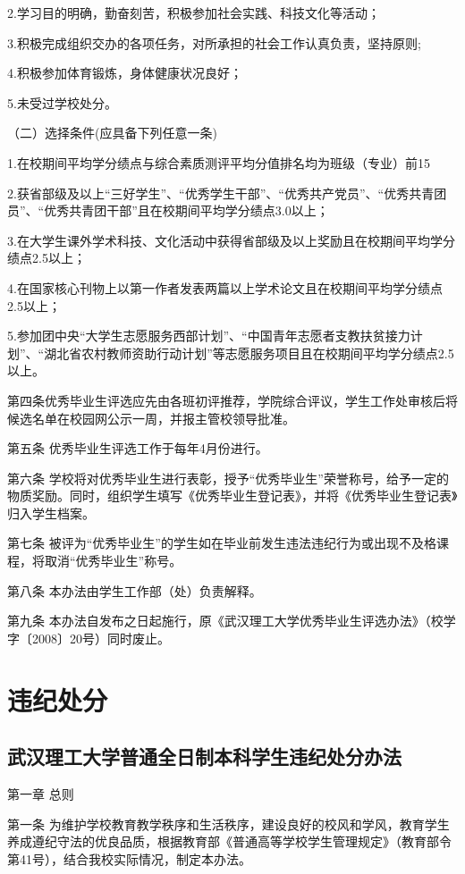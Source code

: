 \documentclass[UTF8,12pt,a4paper]{report}
\begin{document}
2.学习目的明确，勤奋刻苦，积极参加社会实践、科技文化等活动；

3.积极完成组织交办的各项任务，对所承担的社会工作认真负责，坚持原则;

4.积极参加体育锻炼，身体健康状况良好；

5.未受过学校处分。

（二）选择条件(应具备下列任意一条)

1.在校期间平均学分绩点与综合素质测评平均分值排名均为班级（专业）前15%

2.获省部级及以上“三好学生”、“优秀学生干部”、“优秀共产党员”、“优秀共青团员”、“优秀共青团干部”且在校期间平均学分绩点3.0以上；

3.在大学生课外学术科技、文化活动中获得省部级及以上奖励且在校期间平均学分绩点2.5以上；

4.在国家核心刊物上以第一作者发表两篇以上学术论文且在校期间平均学分绩点2.5以上；

5.参加团中央“大学生志愿服务西部计划”、“中国青年志愿者支教扶贫接力计划”、“湖北省农村教师资助行动计划”等志愿服务项目且在校期间平均学分绩点2.5以上。

第四条优秀毕业生评选应先由各班初评推荐，学院综合评议，学生工作处审核后将候选名单在校园网公示一周，并报主管校领导批准。

第五条 优秀毕业生评选工作于每年4月份进行。

第六条 学校将对优秀毕业生进行表彰，授予“优秀毕业生”荣誉称号，给予一定的物质奖励。同时，组织学生填写《优秀毕业生登记表》，并将《优秀毕业生登记表》归入学生档案。

第七条 被评为“优秀毕业生”的学生如在毕业前发生违法违纪行为或出现不及格课程，将取消“优秀毕业生”称号。

第八条 本办法由学生工作部（处）负责解释。

第九条 本办法自发布之日起施行，原《武汉理工大学优秀毕业生评选办法》（校学字〔2008〕20号）同时废止。

\part{违纪处分}
\chapter{武汉理工大学普通全日制本科学生违纪处分办法}
第一章  总则

第一条  为维护学校教育教学秩序和生活秩序，建设良好的校风和学风，教育学生养成遵纪守法的优良品质，根据教育部《普通高等学校学生管理规定》（教育部令第41号），结合我校实际情况，制定本办法。
\end{document}

